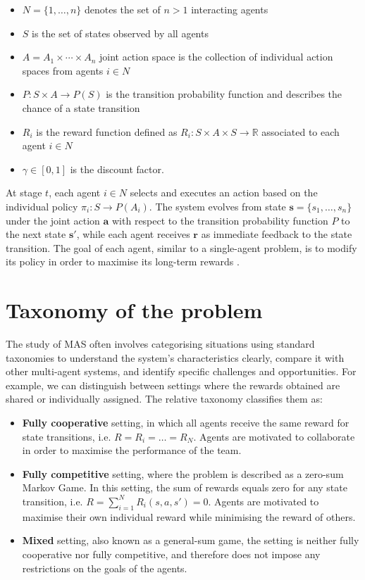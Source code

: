 \documentclass[a4paper,singleside,12pt]{report} %
\begin{document}
\begin{itemize}
\item
  \(N = \{1, \dots, n\}\) denotes the set of \(n > 1\) interacting agents
\item
  \(S\) is the set of states observed by all agents
\item
  \(A = A_1 \times \cdots \times A_n\) joint action space is the
  collection of individual action spaces from agents \(i \in N\)
\item
  \(P: S \times A \rightarrow P(S)\) is the transition probability
  function and describes the chance of a state transition
\item
  \(R_i\) is the reward function defined as
  \(R_i: S \times A \times S \rightarrow \mathbb{R}\) associated to each
  agent \(i \in N\)
\item
  \(\gamma \in [0,1]\) is the discount factor.
\end{itemize}

At stage \(t\), each agent \(i \in N\) selects and executes an action based on the individual policy \(\pi_i: S \rightarrow P(A_i)\). The system evolves from state \(\textbf{s} = \{s_1, \dots, s_n\}\) under the joint action \(\textbf{a}\) with respect to the transition probability function \(P\) to the next state \(\textbf{s}'\), while each agent receives \(\textbf{r}\) as immediate feedback to the state transition. The goal of each agent, similar to a single-agent problem, is to modify its policy in order to maximise its long-term rewards \cite{Rao2000ReinforcementLA}.

\section{Taxonomy of the problem}\label{taxonomy-of-the-problem}
The study of MAS often involves categorising situations using standard taxonomies to understand the system's characteristics clearly, compare it with other multi-agent systems, and identify specific challenges and opportunities. For example, we can distinguish between settings where the rewards obtained are shared or individually assigned. The relative taxonomy classifies them as:

\begin{itemize}
\item \textbf{Fully cooperative} setting, in which all agents receive the same reward for state transitions, i.e. $R = R_i = \dots = R_N$. Agents are motivated to collaborate in order to maximise the performance of the team.
\item \textbf{Fully competitive} setting, where the problem is described as a zero-sum Markov Game. In this setting, the sum of rewards equals zero for any state transition, i.e. $R = \sum_{i=1}^N R_i(s, a, s') = 0$. Agents are motivated to maximise their own individual reward while minimising the reward of others.
\item \textbf{Mixed} setting, also known as a general-sum game, the setting is neither fully cooperative nor fully competitive, and therefore does not impose any restrictions on the goals of the agents.
\end{itemize}
\end{document}
